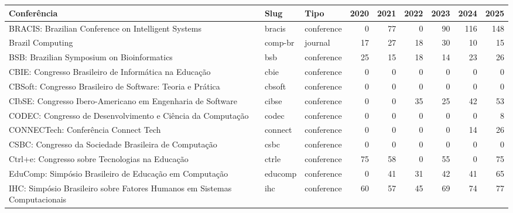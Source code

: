 

\chapter{} \label{apen:appendix_A}

\appendix
\vspace*{-1.5cm} %

\begin{table}[H]
\centering
\label{tab:apendice-conferencias}
\scriptsize
\setlength{\tabcolsep}{1.5pt}
\renewcommand{\arraystretch}{1}
\begin{tabular}{|p{10cm}|l|l|r|r|r|r|r|r|}
\hline
\textbf{Conferência} & \textbf{Slug} & \textbf{Tipo} & \textbf{2020} & \textbf{2021} & \textbf{2022} & \textbf{2023} & \textbf{2024} & \textbf{2025} \\
\hline
BRACIS: Brazilian Conference on Intelligent Systems & bracis & conference & 0 & 77 & 0 & 90 & 116 & 148 \\
\hline
Brazil Computing & comp-br & journal & 17 & 27 & 18 & 30 & 10 & 15 \\
\hline
BSB: Brazilian Symposium on Bioinformatics & bsb & conference & 25 & 15 & 18 & 14 & 23 & 26 \\
\hline
CBIE: Congresso Brasileiro de Informática na Educação & cbie & conference & 0 & 0 & 0 & 0 & 0 & 0 \\
\hline
CBSoft: Congresso Brasileiro de Software: Teoria e Prática & cbsoft & conference & 0 & 0 & 0 & 0 & 0 & 0 \\
\hline
CIbSE: Congresso Ibero-Americano em Engenharia de Software & cibse & conference & 0 & 0 & 35 & 25 & 42 & 53 \\
\hline
CODEC: Congresso de Desenvolvimento e Ciência da Computação & codec & conference & 0 & 0 & 0 & 0 & 0 & 8 \\
\hline
CONNECTech: Conferência Connect Tech & connect & conference & 0 & 0 & 0 & 0 & 14 & 26 \\
\hline
CSBC: Congresso da Sociedade Brasileira de Computação & csbc & conference & 0 & 0 & 0 & 0 & 0 & 0 \\
\hline
Ctrl+e: Congresso sobre Tecnologias na Educação & ctrle & conference & 75 & 58 & 0 & 55 & 0 & 75 \\
\hline
EduComp: Simpósio Brasileiro de Educação em Computação & educomp & conference & 0 & 41 & 31 & 42 & 41 & 65 \\
\hline
IHC: Simpósio Brasileiro sobre Fatores Humanos em Sistemas Computacionais & ihc & conference & 60 & 57 & 45 & 69 & 74 & 77 \\

\end{tabular}
\end{table}
